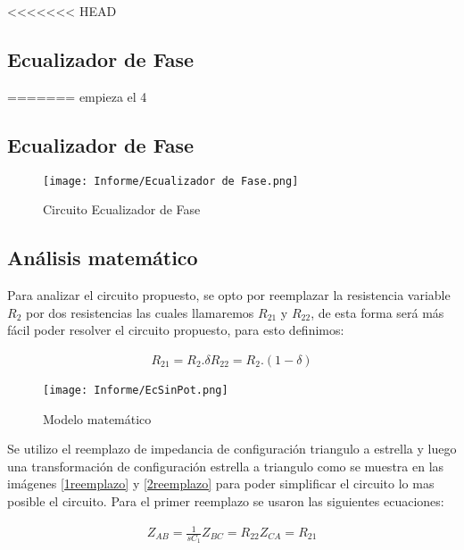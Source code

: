 <<<<<<< HEAD
\subsection{Ecualizador de Fase}
=======
empieza el 4

\subsection{Ecualizador de Fase}


\begin{figure}[H]
	\caption{Circuito Ecualizador de Fase}
	\centering
	\texttt{[image: Informe/Ecualizador de Fase.png]}
\end{figure}


\subsection{Análisis matemático}

Para analizar el circuito propuesto, se opto por reemplazar la resistencia variable $R_2$ por dos resistencias las cuales llamaremos $R_{21}$ y $R_{22}$, de esta forma será más fácil poder resolver el circuito propuesto, para esto definimos:

\begin{align}

	\begin{equation}
		R_{21} = R_2 . \delta
	\end{equation}

	\begin{equation}
		R_{22}= R_2 . (1 - \delta)
	\end{equation}

\end{align}


\begin{figure}[H]
	\centering
	\texttt{[image: Informe/EcSinPot.png]}
	\caption{Modelo matemático}
\end{figure}

Se utilizo el reemplazo de impedancia de configuración triangulo a estrella y luego una transformación de configuración estrella a triangulo como se muestra en las imágenes \ref{1reemplazo} y \ref{2reemplazo}  para poder simplificar el circuito lo mas posible el circuito.
Para el primer reemplazo se usaron las siguientes ecuaciones:

\begin{align}

	\begin{equation}
		Z_{AB}= \frac{1}{sC_1}
	\end{equation}

	\begin{equation}
		Z_{BC}= R_{22}
	\end{equation}
	
	\begin{equation}
		Z_{CA}= R_{21}
	\end{equation}

\end{align}

